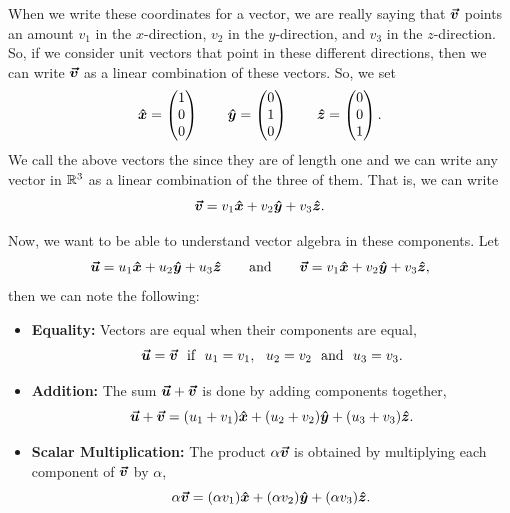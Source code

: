         When we write these coordinates for a vector, we are really saying that $\boldsymbol{\boldsymbol{\vec{v}}}$ points an amount $v_1$ in the $x$-direction, $v_2$ in the $y$-direction, and $v_3$ in the $z$-direction.  So, if we consider unit vectors that point in these different directions, then we can  write $\boldsymbol{\boldsymbol{\vec{v}}}$ as a linear combination of these vectors.  So, we set
        \[
        \boldsymbol{\hat{x}} = \begin{pmatrix} 1 \\ 0 \\ 0 \end{pmatrix} \qquad \boldsymbol{\hat{y}} = \begin{pmatrix} 0 \\ 1 \\ 0 \end{pmatrix} \qquad \boldsymbol{\hat{z}} = \begin{pmatrix} 0 \\ 0 \\ 1 \end{pmatrix}.
        \]
        We call the above vectors the  since they are of  length one and we can write any vector in $\mathbb{R}^3$ as a linear combination of the three of them.  That is, we can write 
        \[
        \boldsymbol{\boldsymbol{\vec{v}}} = v_1 \boldsymbol{\hat{x}} + v_2 \boldsymbol{\hat{y}} + v_3 \boldsymbol{\hat{z}}.
        \]
        

        Now, we want to be able to understand vector algebra in these components. Let 
        \[
        \boldsymbol{\boldsymbol{\vec{u}}} = u_1 \boldsymbol{\hat{x}} + u_2 \boldsymbol{\hat{y}} + u_3 \boldsymbol{\hat{z}} \qquad \textrm{and} \qquad \boldsymbol{\boldsymbol{\vec{v}}} = v_1 \boldsymbol{\hat{x}} + v_2 \boldsymbol{\hat{y}} + v_3 \boldsymbol{\hat{z}},
        \]
        then we can note the following:
        
        \begin{itemize}
            \item \textbf{Equality:} Vectors are equal when their components are equal,
            \[
            \boldsymbol{\boldsymbol{\vec{u}}}=\boldsymbol{\boldsymbol{\vec{v}}} ~~ \textrm{if} ~~ u_1=v_1, ~~ u_2=v_2 ~~ \textrm{and} ~~ u_3=v_3.
            \]
            \item \textbf{Addition:} The sum $\boldsymbol{\boldsymbol{\vec{u}}} + \boldsymbol{\boldsymbol{\vec{v}}}$ is done by adding components together,
            \[
            \boldsymbol{\boldsymbol{\vec{u}}}+\boldsymbol{\boldsymbol{\vec{v}}}=(u_1+v_1)\boldsymbol{\hat{x}} + (u_2 + v_2)\boldsymbol{\hat{y}} + (u_3 + v_3)\boldsymbol{\hat{z}}.
            \]
            \item \textbf{Scalar Multiplication:} The product $\alpha \boldsymbol{\boldsymbol{\vec{v}}}$ is obtained by multiplying each component of $\boldsymbol{\boldsymbol{\vec{v}}}$ by $\alpha$,
            \[
            \alpha \boldsymbol{\boldsymbol{\vec{v}}} = (\alpha v_1) \boldsymbol{\hat{x}} + (\alpha v_2)\boldsymbol{\hat{y}} + (\alpha v_3)\boldsymbol{\hat{z}}.
            \]
        \end{itemize}
        
